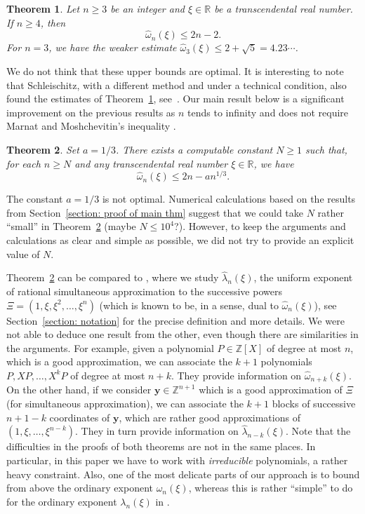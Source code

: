 \documentclass[JEP,XML,SOM,Unicode,NoFloatCountersInSection,published]{cedram}
\newcommand\by{\boldsymbol{y}}
\newcommand\bR{\mathbb{R}}
\newcommand\bZ{\mathbb{Z}}
\newcommand\hlambda{\widehat{\lambda}}
\newcommand\homega{\widehat{\omega}}\newcommand\HH{\mathcal{H}}
\theoremstyle{definition}
\theoremstyle{plain}
\newtheorem{Thm}{Theorem}[section]
\begin{document}
\begin{Thm}
\label{Thm : main d=2}
Let $n\geq 3$ be an integer and $\xi\in\bR$ be a transcendental real number. If $n\geq 4$, then
\begin{equation*}
\homega_n(\xi) \leq 2n-2.
\end{equation*}
For $n=3$, we have the weaker estimate $\homega_3(\xi)\leq 2+\sqrt 5 = 4.23\cdots$.
\end{Thm}

We do not think that these upper bounds are optimal. It is interesting to note that Schleischitz, with a different method and under a technical condition, also found the estimates of Theorem~\ref{Thm : main d=2}, see~\cite{schleischitz2024uniform}. Our main result below is a significant improvement on the previous results as $n$ tends to infinity and does not require Marnat and Moshchevitin's inequality \cite{marnat2018optimal}.
\begin{Thm}
\label{Thm : main}
Set $a=1/3$. There exists a computable constant $N\geq 1$ such that, for each $n\geq N$ and any transcendental real number $\xi\in\bR$, we have
\begin{equation*}
\homega_n(\xi) \leq 2n- an^{1/3}.
\end{equation*}
\end{Thm}
The constant $a=1/3$ is not optimal. Numerical calculations based on the results from Section~\ref{section: proof of main thm} suggest that we could take $N$ rather ``small'' in Theorem~\ref{Thm : main} (maybe $N\leq 10^4$?). However, to keep the arguments and calculations as clear and simple as possible, we did not try to provide an explicit value of $N$.

Theorem~\ref{Thm : main} can be compared to \cite[Th.\,1.1]{poels2022simultaneous}, where we study $\hlambda_n(\xi)$, the uniform exponent of rational simultaneous approximation to the successive powers $\Xi=(1,\xi,\xi^2,\dots,\xi^n)$ (which is known to be, in a sense, dual to $\homega_n(\xi)$), see Section~\ref{section: notation} for the precise definition and more details. We were not able to deduce one result from the other, even though there are similarities in the arguments. For example, given a polynomial $P\in\bZ[X]$ of degree at most $n$, which is a good approximation, we can associate the $k+1$ polynomials $P,XP,\dots,X^{k}P$ of degree at most $n+k$. They provide information on $\homega_{n+k}(\xi)$. On the other hand, if we consider $\by\in\bZ^{n+1}$ which is a good approximation of $\Xi$ (for simultaneous approximation), we can associate the $k+1$ blocks of successive $n+1-k$ coordinates of $\by$, which are rather good approximations of $(1,\xi,\dots,\xi^{n-k})$. They in turn provide information on $\hlambda_{n-k}(\xi)$. Note that the difficulties in the proofs of both theorems are not in the same places. In particular, in this paper we have to work with \emph{irreducible} polynomials, a rather heavy constraint. Also, one of the most delicate parts of our approach is to bound from above the ordinary exponent $\omega_n(\xi)$, whereas this is rather ``simple'' to do for the ordinary exponent $\lambda_n(\xi)$ in \cite{poels2022simultaneous}.
\end{document}
